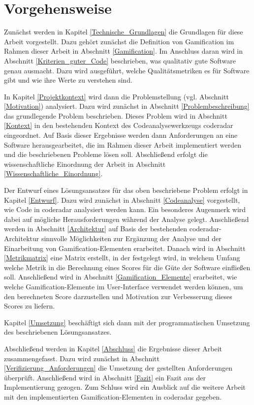 \documentclass[
	oneside,  %
	ngerman, 
	final, 
	11pt, 
	a4paper, 
	1.1headlines, 
	headinclude=false, 
	footinclude=false, 
	mpinclude=false, 
	pagesize, 
	onecolumn, 
	titlepage, 
	parskip=half, 
	headsepline, 
	chapterprefix=false, 
	version=first, 
	listof=totoc, 
	bibliography=totoc, 
	toc=graduated, 
	fleqn
]{scrbook}
\begin{document}
\section{Vorgehensweise}
\label{Vorgehensweise}
Zunächst werden in Kapitel \ref{Technische_Grundlagen} die Grundlagen für diese Arbeit vorgestellt.
Dazu gehört zunächst die Definition von Gamification im Rahmen dieser Arbeit in Abschnitt \ref{Gamification}.
Im Anschluss daran wird in Abschnitt \ref{Kriterien_guter_Code} beschrieben, was qualitativ gute Software genau ausmacht.
Dazu wird ausgeführt, welche Qualitätsmetriken es für Software gibt und wie ihre Werte zu verstehen sind.

In Kapitel \ref{Projektkontext} wird dann die Problemstellung (vgl. Abschnitt \ref{Motivation}) analysiert.
Dazu wird zunächst in Abschnitt \ref{Problembeschreibung} das grundlegende Problem beschrieben.
Dieses Problem wird in Abschnitt \ref{Kontext} in den bestehenden Kontext des Codeanalysewerkzeugs coderadar eingeordnet.
Auf Basis dieser Ergebnisse werden dann Anforderungen an eine Software herausgearbeitet, die im Rahmen dieser Arbeit implementiert werden und die beschriebenen Probleme lösen soll.
Abschließend erfolgt die wissenschaftliche Einordnung der Arbeit in Abschnitt \ref{Wissenschaftliche_Einordnung}.

Der Entwurf eines Lösungsansatzes für das oben beschriebene Problem erfolgt in Kapitel \ref{Entwurf}.
Dazu wird zunächst in Abschnitt \ref{Codeanalyse} vorgestellt, wie Code in coderadar analysiert werden kann.
Ein besonderes Augenmerk wird dabei auf mögliche Herausforderungen während der Analyse gelegt.
Anschließend werden in Abschnitt \ref{Architektur} auf Basis der bestehenden coderadar-Architektur sinnvolle Möglichkeiten zur Ergänzung der Analyse und der Einarbeitung von Gamification-Elementen erarbeitet.
Danach wird in Abschnitt \ref{Metrikmatrix} eine Matrix erstellt, in der festgelegt wird, in welchem Umfang welche Metrik in die Berechnung eines Scores für die Güte der Software einfließen soll.
Anschließend wird in Abschnitt \ref{Gamification_Elemente} erarbeitet, wie welche Gamification-Elemente im User-Interface verwendet werden können, um den berechneten Score darzustellen und Motivation zur Verbesserung dieses Scores zu liefern.

Kapitel \ref{Umsetzung} beschäftigt sich dann mit der programmatischen Umsetzung des beschriebenen Lösungsansatzes. 

Abschließend werden in Kapitel \ref{Abschluss} die Ergebnisse dieser Arbeit zusammengefasst.
Dazu wird zunächst in Abschnitt \ref{Verifizierung_Anforderungen} die Umsetzung der gestellten Anforderungen überprüft.
Anschließend wird in Abschnitt \ref{Fazit} ein Fazit aus der Implementierung gezogen.
Zum Schluss wird ein Ausblick auf die weitere Arbeit mit den implementierten Gamification-Elementen in coderadar gegeben.
\end{document}
